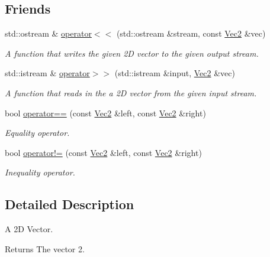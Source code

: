 \subsection*{Friends}
\begin{DoxyCompactItemize}
\item 
std\+::ostream \& \hyperlink{structgfxmath_1_1_vec2_ad005834b5ab6266c15870a8675ca62f0}{operator$<$$<$} (std\+::ostream \&stream, const \hyperlink{structgfxmath_1_1_vec2}{Vec2} \&vec)
\begin{DoxyCompactList}\small\item\em A function that writes the given 2\+D vector to the given output stream. \end{DoxyCompactList}\item 
std\+::istream \& \hyperlink{structgfxmath_1_1_vec2_ae4375ee134e3faa8eb2a4e4e773d776d}{operator$>$$>$} (std\+::istream \&input, \hyperlink{structgfxmath_1_1_vec2}{Vec2} \&vec)
\begin{DoxyCompactList}\small\item\em A function that reads in the a 2\+D vector from the given input stream. \end{DoxyCompactList}\item 
bool \hyperlink{structgfxmath_1_1_vec2_abed4a0c0a66b1b50c31c8448ddb2384d}{operator==} (const \hyperlink{structgfxmath_1_1_vec2}{Vec2} \&left, const \hyperlink{structgfxmath_1_1_vec2}{Vec2} \&right)
\begin{DoxyCompactList}\small\item\em Equality operator. \end{DoxyCompactList}\item 
bool \hyperlink{structgfxmath_1_1_vec2_a95f55509aeacabec75d0a5289c57cfcc}{operator!=} (const \hyperlink{structgfxmath_1_1_vec2}{Vec2} \&left, const \hyperlink{structgfxmath_1_1_vec2}{Vec2} \&right)
\begin{DoxyCompactList}\small\item\em Inequality operator. \end{DoxyCompactList}\end{DoxyCompactItemize}


\subsection{Detailed Description}
A 2\+D Vector. 

\begin{DoxyReturn}{Returns}
The vector 2. 
\end{DoxyReturn}


